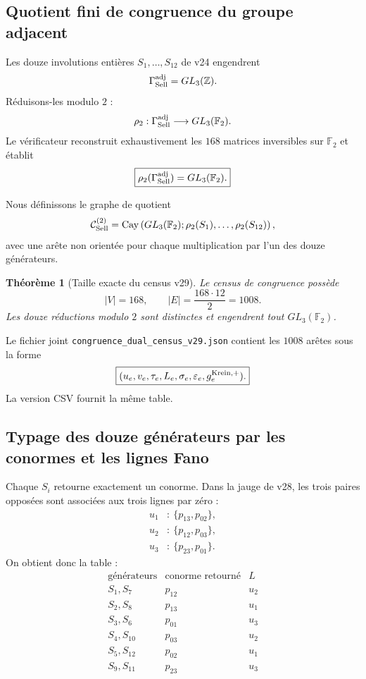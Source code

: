 \documentclass[11pt,a4paper]{article}
\newtheorem{theorem}{Théorème}[section]
\begin{document}
\subsection{Quotient fini de congruence du groupe adjacent}

Les douze involutions entières $S_1,\ldots,S_{12}$ de v24 engendrent
\[
 \Gamma_{\rm Sell}^{\rm adj}=GL_3(\mathbb Z).
\]
Réduisons-les modulo $2$ :
\[
 \rho_2:
 \Gamma_{\rm Sell}^{\rm adj}
 \longrightarrow
 GL_3(\mathbb F_2).
\]
Le vérificateur reconstruit exhaustivement les $168$ matrices inversibles sur $\mathbb F_2$ et établit
\[
 \boxed{
 \rho_2(\Gamma_{\rm Sell}^{\rm adj})
 =
 GL_3(\mathbb F_2).}
\]

Nous définissons le graphe de quotient
\[
 \mathcal C_{\rm Sell}^{(2)}
 =
 \operatorname{Cay}
 \left(
 GL_3(\mathbb F_2);
 \rho_2(S_1),\ldots,\rho_2(S_{12})
 \right),
\]
avec une arête non orientée pour chaque multiplication par l'un des douze générateurs.

\begin{theorem}[Taille exacte du census v29]\label{thm:v29-census-size}
Le census de congruence possède
\[
 \boxed{
 |V|=168,
 \qquad
 |E|=\frac{168\cdot12}{2}=1008.}
\]
Les douze réductions modulo $2$ sont distinctes et engendrent tout $GL_3(\mathbb F_2)$.
\end{theorem}

Le fichier joint \texttt{congruence\_dual\_census\_v29.json} contient les $1008$ arêtes sous la forme
\begin{equation}\label{eq:v29-full-edge-tuple}
 \boxed{
 (u_e,v_e,\tau_e,L_e,\sigma_e,\varepsilon_e,g^{\rm Krein,+}_e).}
\end{equation}
La version CSV fournit la même table.

\subsection{Typage des douze générateurs par les conormes et les lignes Fano}

Chaque $S_i$ retourne exactement un conorme. Dans la jauge de v28, les trois paires opposées sont associées aux trois lignes par zéro :
\[
 \begin{aligned}
 u_1&:\ \{p_{13},p_{02}\},\\
 u_2&:\ \{p_{12},p_{03}\},\\
 u_3&:\ \{p_{23},p_{01}\}.
 \end{aligned}
\]
On obtient donc la table :
\[
\begin{array}{c|c|c}
\text{générateurs}&\text{conorme retourné}&L\\
\hline
S_1,S_7&p_{12}&u_2\\
S_2,S_8&p_{13}&u_1\\
S_3,S_6&p_{01}&u_3\\
S_4,S_{10}&p_{03}&u_2\\
S_5,S_{12}&p_{02}&u_1\\
S_9,S_{11}&p_{23}&u_3
\end{array}
\]
\end{document}
